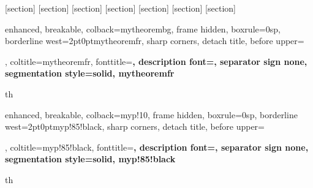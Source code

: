 

\usepackage{amsmath,amsfonts,amsthm,amssymb,mathtools}

\usepackage{enumitem}
\usepackage[most,many,breakable]{tcolorbox}
\usepackage{xcolor}
\usepackage{pgfplots}
\pgfplotsset{compat=1.17}
\usetikzlibrary{calc}
\usetikzlibrary{positioning}
\usepackage{tikz-cd}

\renewcommand{\subsubsection}[1]{%
  \vspace{0.5em}
  \textbf{\large #1}\mbox{}\\
  \vspace{0.5em}}




[section]
[section]
[section]
[section]
[section]
[section]
[section]

{enhanced, breakable, colback=mytheorembg, frame hidden, boxrule=0sp,
  borderline west={2pt}{0pt}{mytheoremfr}, sharp corners, detach title,
  before upper={\renewcommand{\familydefault}{\sfdefault}\selectfont\tcbtitle\par\smallskip},
  coltitle=mytheoremfr, fonttitle=\bfseries\sffamily, description font=\mdseries,
  separator sign none, segmentation style={solid, mytheoremfr}}{th}

{enhanced, breakable, colback=myp!10, frame hidden, boxrule=0sp,
  borderline west={2pt}{0pt}{myp!85!black}, sharp corners, detach title,
  before upper={\renewcommand{\familydefault}{\sfdefault}\selectfont\tcbtitle\par\smallskip},
  coltitle=myp!85!black, fonttitle=\bfseries\sffamily, description font=\mdseries,
  separator sign none, segmentation style={solid, myp!85!black}}{th}

